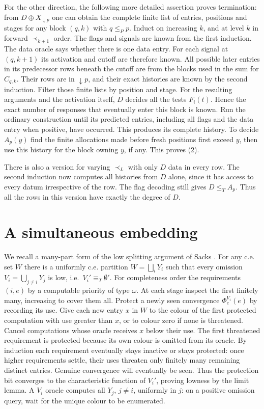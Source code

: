 \documentclass[11pt]{article}
\begin{document}
For the other direction, the following more detailed assertion proves termination: from $D\oplus X_{\downarrow p}$ one can obtain the complete finite list of entries, positions and stages for any block $(q,k)$ with $q\le_P p$. Induct on increasing $k$, and at level $k$ in forward $\prec_{k+1}$ order. The flags and signals are known from the first induction. The data oracle says whether there is one data entry. For each signal at $(q,k+1)$ its activation and cutoff are therefore known. All possible later entries in its predecessor rows beneath the cutoff are from the blocks used in the sum for $C_{q,k}$. Their rows are in $\downarrow p$, and their exact histories are known by the second induction. Filter those finite lists by position and stage. For the resulting arguments and the activation itself, $D$ decides all the tests $F_i(t)$. Hence the exact number of responses that eventually enter this block is known. Run the ordinary construction until its predicted entries, including all flags and the data entry when positive, have occurred. This produces its complete history. To decide $A_p(y)$ find the finite allocations made before fresh positions first exceed $y$, then use this history for the block owning $y$, if any. This proves (2).

There is also a version for varying $\prec_L$ with only $D$ data in every row. The second induction now computes all histories from $D$ alone, since it has access to every datum irrespective of the row. The flag decoding still gives $D\le_T A_p$. Thus all the rows in this version have exactly the degree of $D$.

\section{A simultaneous embedding}
We recall a many-part form of the low splitting argument of Sacks \cite{sacks}. For any c.e. set $W$ there is a uniformly c.e. partition $W=\bigsqcup_i Y_i$ such that every omission $V_i=\bigcup_{j\ne i}Y_j$ is low, i.e.\ $V_i'\equiv_T\emptyset'$. For completeness order the requirements $(i,e)$ by a computable priority of type $\omega$. At each stage inspect the first finitely many, increasing to cover them all. Protect a newly seen convergence $\Phi_e^{V_i}(e)$ by recording its use. Give each new entry $x$ in $W$ to the colour of the first protected computation with use greater than $x$, or to colour zero if none is threatened. Cancel computations whose oracle receives $x$ below their use. The first threatened requirement is protected because its own colour is omitted from its oracle. By induction each requirement eventually stays inactive or stays protected: once higher requirements settle, their uses threaten only finitely many remaining distinct entries. Genuine convergence will eventually be seen. Thus the protection bit converges to the characteristic function of $V_i'$, proving lowness by the limit lemma. A $V_i$ oracle computes all $Y_j$, $j\ne i$, uniformly in $j$: on a positive omission query, wait for the unique colour to be enumerated.
\end{document}

